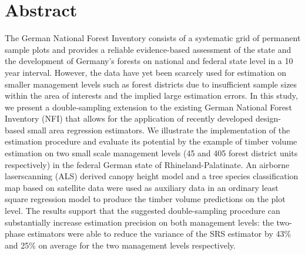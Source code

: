 
\section*{Abstract} 
\label{sec:abstract}
The German National Forest Inventory consists of a systematic grid of permanent sample plots and provides a reliable evidence-based assessment of the state and the development of Germany's forests on national and federal state level in a 10 year interval. However, the data have yet been scarcely used for estimation on smaller management levels such as forest districts due to insufficient sample sizes within the area of interests and the implied large estimation errors. In this study, we present a double-sampling extension to the existing German National Forest Inventory (NFI) that allows for the application of recently developed design-based small area regression estimators. We illustrate the implementation of the estimation procedure and evaluate its potential by the example of timber volume estimation on two small scale management levels (45 and 405 forest district units respectively) in the federal German state of Rhineland-Palatinate. An airborne laserscanning (ALS) derived canopy height model and a tree species classification map based on satellite data were used as auxiliary data in an ordinary least square regression model to produce the timber volume predictions on the plot level.
The results support that the suggested double-sampling procedure can substantially increase estimation precision on both management levels: the two-phase estimators were able to reduce the variance of the SRS estimator by 43\% and 25\% on average for the two management levels respectively.



